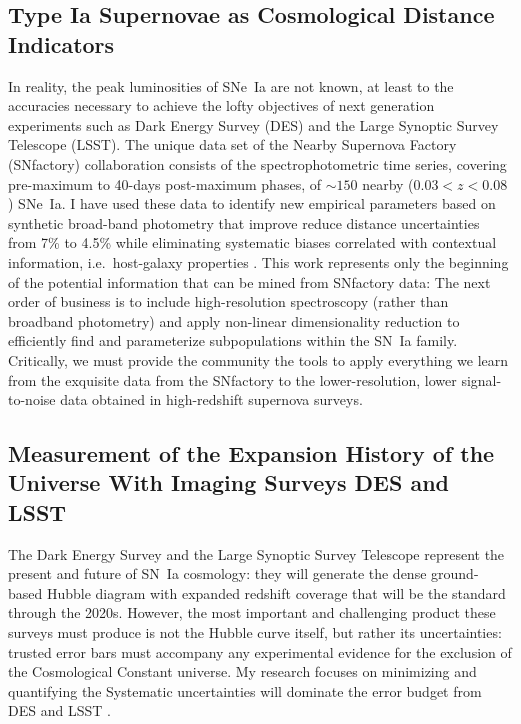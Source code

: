 \documentclass{article}
\begin{document}
\subsection{Type Ia Supernovae as Cosmological Distance Indicators}
In reality, the peak luminosities of SNe~Ia are not known, at least to the accuracies necessary
to achieve the lofty objectives of next generation experiments such as Dark Energy Survey (DES) and the Large Synoptic
Survey Telescope (LSST).  The unique data set of
the Nearby Supernova Factory (SNfactory) collaboration consists of the spectrophotometric
time series, covering pre-maximum to 40-days post-maximum phases,
of  $\sim 150$ nearby ($0.03<z<0.08$) SNe~Ia.
I have used these data  to identify new
empirical
parameters based on synthetic broad-band photometry that improve reduce distance uncertainties from 7\% to 4.5\% \cite{2013ApJ...766...84K}
while eliminating systematic biases correlated with contextual information, i.e.\ host-galaxy
properties \cite{2014ApJ...784...51K}.  This work represents only the beginning of the
potential information that can be mined from  SNfactory data: The next order of business
is to include high-resolution spectroscopy (rather than  broadband photometry)
and apply non-linear dimensionality reduction to efficiently find and parameterize
subpopulations   within the SN~Ia family.  Critically, we must provide the community the tools
to apply everything we learn from the
exquisite data from the SNfactory to the lower-resolution, lower signal-to-noise data obtained
in high-redshift supernova surveys.

\subsection{Measurement of the Expansion History of the Universe With Imaging Surveys  DES and LSST}
The Dark Energy Survey and the Large Synoptic Survey Telescope represent the present and future of
SN~Ia cosmology: they
will generate the dense ground-based Hubble diagram with expanded redshift coverage that will be the standard
through the 2020s.  However,
the most important and challenging product these surveys must produce is not the Hubble curve itself,
but rather its uncertainties: trusted error bars must accompany any experimental evidence for the exclusion
of the Cosmological
Constant universe. My research focuses on
minimizing and quantifying the
Systematic uncertainties will dominate the error budget from DES and LSST \cite{2004MNRAS.347..909K}.  
\end{document}
